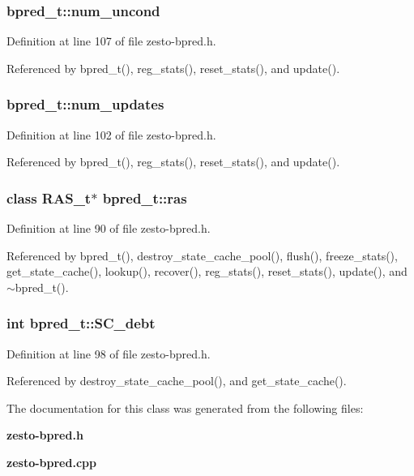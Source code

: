 \subsubsection[{num\_\-uncond}]{ {\bf bpred\_\-t::num\_\-uncond}\hspace{0.3cm}{\tt  [protected]}}\label{classbpred__t_53953ed71e763537bedb1fb12bdd6979}




Definition at line 107 of file zesto-bpred.h.

Referenced by bpred\_\-t(), reg\_\-stats(), reset\_\-stats(), and update().
\subsubsection[{num\_\-updates}]{ {\bf bpred\_\-t::num\_\-updates}\hspace{0.3cm}{\tt  [protected]}}\label{classbpred__t_1daed1dfe9ffc4f9348e8389cb5124c7}




Definition at line 102 of file zesto-bpred.h.

Referenced by bpred\_\-t(), reg\_\-stats(), reset\_\-stats(), and update().
\subsubsection[{ras}]{\setlength{\rightskip}{0pt plus 5cm}class {\bf RAS\_\-t}$\ast$ {\bf bpred\_\-t::ras}\hspace{0.3cm}{\tt  [protected]}}\label{classbpred__t_19b366397440390436a4dd3617e87746}




Definition at line 90 of file zesto-bpred.h.

Referenced by bpred\_\-t(), destroy\_\-state\_\-cache\_\-pool(), flush(), freeze\_\-stats(), get\_\-state\_\-cache(), lookup(), recover(), reg\_\-stats(), reset\_\-stats(), update(), and $\sim$bpred\_\-t().
\subsubsection[{SC\_\-debt}]{\setlength{\rightskip}{0pt plus 5cm}int {\bf bpred\_\-t::SC\_\-debt}\hspace{0.3cm}{\tt  [protected]}}\label{classbpred__t_2059f9daab0482f8a3c0a4769732f6be}




Definition at line 98 of file zesto-bpred.h.

Referenced by destroy\_\-state\_\-cache\_\-pool(), and get\_\-state\_\-cache().

The documentation for this class was generated from the following files:\begin{CompactItemize}
\item 
{\bf zesto-bpred.h}\item 
{\bf zesto-bpred.cpp}\end{CompactItemize}

